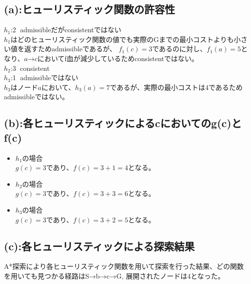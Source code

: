 \documentclass[a4paper,11pt,dvipdfmx]{jsarticle}
\begin{document}
\subsection{(a):ヒューリスティック関数の許容性}
$h_1$:\textcircled{\scriptsize 2} admissibleだがconsistentではない \\
$h_1$はどのヒューリスティック関数の値でも実際のGまでの最小コストよりも小さい値を返すためadmissibleであるが、
$f_1(c) = 3$であるのに対し、$f_1(a) = 5$となり、$a$→$c$においてf血が減少しているためconsistentではない。\\

$h_2$:\textcircled{\scriptsize 3} consistent \\

$h_3$:\textcircled{\scriptsize 1} admissibleではない \\
$h_3$はノード$a$において、$h_3(a) = 7$であるが、実際の最小コストは4であるためadmissibleではない。

\subsection{(b):各ヒューリスティックによるcにおいてのg(c)とf(c)}
\begin{itemize}
    \item $h_1$の場合 \\
    $g(c) = 3$であり、$f(c) = 3 + 1 = 4$となる。
    \item $h_2$の場合 \\
    $g(c) = 3$であり、$f(c) = 3 + 3 = 6$となる。
    \item $h_3$の場合 \\
    $g(c) = 3$であり、$f(c) = 3 + 2 = 5$となる。
\end{itemize}

\subsection{(c):各ヒューリスティックによる探索結果}
A*探索により各ヒューリスティック関数を用いて探索を行った結果、どの関数を用いても見つかる経路はS→b→c→G, 展開されたノードは4となった。
\end{document}

